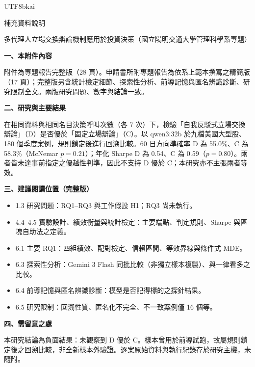 \documentclass[12pt,a4paper]{article}
\begin{document}
\begin{CJK}{UTF8}{bkai}

{\centering\fontsize{16}{24}\selectfont 補充資料說明\par}
\vspace{2pt}
{\centering 多代理人立場交換辯論機制應用於投資決策（國立陽明交通大學管理科學系專題）\par}
\vspace{10pt}

\textbf{一、本附件內容}\par
附件為專題報告完整版（28 頁）。申請書所附專題報告為依系上範本撰寫之精簡版（17 頁）；完整版另含統計檢定細節、探索性分析、前導記憶與匿名辨識診斷、研究限制全文。兩版研究問題、數字與結論一致。

\vspace{8pt}
\textbf{二、研究與主要結果}\par
在相同資料與相同名目決策呼叫次數（各 7 次）下，檢驗「自我反駁式立場交換辯論」（D）是否優於「固定立場辯論」（C）。以 qwen3:32b 於九檔美國大型股、180 個季度案例，規則鎖定後進行回溯比較。60 日方向準確率 D 為 55.0\%、C 為 58.3\%（McNemar $p=0.21$）；年化 Sharpe D 為 0.54、C 為 0.59（$p=0.80$）。兩者皆未達事前指定之優越性判準，因此不支持 D 優於 C；本研究亦不主張兩者等效。

\vspace{8pt}
\textbf{三、建議閱讀位置（完整版）}
\begin{itemize}[itemsep=2pt,topsep=4pt]
\item 1.3 研究問題：RQ1--RQ3 與工作假設 H1；RQ3 尚未執行。
\item 4.4--4.5 實驗設計、績效衡量與統計檢定：主要端點、判定規則、Sharpe 與區塊自助法之定義。
\item 6.1 主要 RQ1：四組績效、配對檢定、信賴區間、等效界線與條件式 MDE。
\item 6.3 探索性分析：Gemini 3 Flash 同批比較（非獨立樣本複製）、與一律看多之比較。
\item 6.4 前導記憶與匿名辨識診斷：模型是否記得標的之探針結果。
\item 6.5 研究限制：回溯性質、匿名化不完全、不一致案例僅 16 個等。
\end{itemize}

\vspace{4pt}
\textbf{四、需留意之處}\par
本研究結論為負面結果：未觀察到 D 優於 C。樣本曾用於前導試跑，故屬規則鎖定後之回溯比較，非全新樣本外驗證。逐案原始資料與執行紀錄存於研究主機，未隨附。

\end{CJK}
\end{document}
